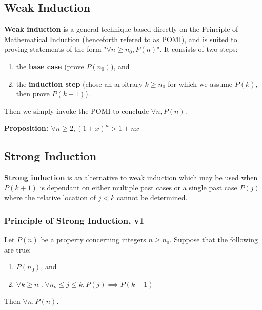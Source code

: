 \documentclass[12pt]{article}
\newcommand{\proposition}[1]{{\bf Proposition: \textit{#1}}}
\begin{document}
\subsection*{Weak Induction}
{\bf Weak induction} is a general technique based directly on the Principle of Mathematical Induction (henceforth refered to as POMI), and is suited to proving statements of the form "$\forall n \geq n_0, P(n)$". It consists of two steps:
\begin{enumerate}
\item the {\bf base case} (prove $P(n_0)$), and
\item the {\bf induction step} (chose an arbitrary $k \geq n_0$ for which we assume $P(k)$, then prove $P(k+1)$).
\end{enumerate}

Then we simply invoke the POMI to conclude $\forall n, P(n)$.

\proposition{$\forall n \geq 2, (1 + x)^n > 1 + nx$}


\subsection*{Strong Induction}
{\bf Strong induction} is an alternative to weak induction which may be used when $P(k+1)$ is dependant on either multiple past cases or a single past case $P(j)$ where the relative location of $j < k$ cannot be determined.

\subsubsection*{Principle of Strong Induction, v1}
 Let $P(n)$ be a property concerning integers $n \geq n_0$. Suppose that the following are true:
\begin{enumerate}
\item $P(n_0)$, and
\item $\forall k \geq n_0, \forall n_o \leq j \leq k, P(j) \implies P(k+1)$
\end{enumerate}
Then $\forall n, P(n)$.
\end{document}
